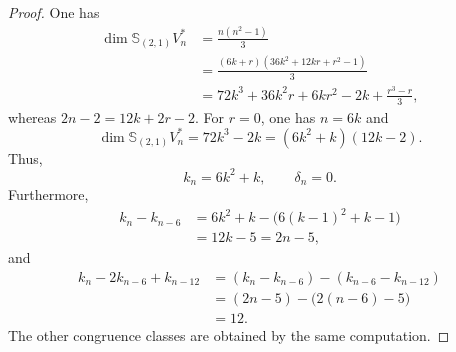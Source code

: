 \documentclass[a4paper,reqno]{amsart}
\theoremstyle{plainnopunct}
\theoremstyle{definitionnopunct}
\renewcommand{\S}{\mathbb{S}}
\begin{document}
\begin{proof}
One has
\[
\begin{aligned}
\dim\S_{(2,1)}V_n^*
&=
\frac{n(n^2-1)}{3}
\\
&=
\frac{
(6k+r)
\left(
36k^2+12kr+r^2-1
\right)
}{3}
\\
&=
72k^3
+
36k^2r
+
6kr^2
-
2k
+
\frac{r^3-r}{3},
\end{aligned}
\]
whereas
$2n-2
=
12k+2r-2$. For $r=0$, one has $n=6k$ and
\[
\dim\S_{(2,1)}V_n^*
=
72k^3-2k
=
(6k^2+k)(12k-2).
\]
Thus,
\[
k_n=6k^2+k,
\qquad
\delta_n=0.
\]
Furthermore,
\[
\begin{aligned}
k_n-k_{n-6}
&=
6k^2+k
-
\bigl(
6(k-1)^2+k-1
\bigr)
\\
&=
12k-5
=
2n-5,
\end{aligned}
\]
and
\[
\begin{aligned}
k_n-2k_{n-6}+k_{n-12}
&=
(k_n-k_{n-6})
-
(k_{n-6}-k_{n-12})
\\
&=
(2n-5)
-
\bigl(
2(n-6)-5
\bigr)
\\
&=
12.
\end{aligned}
\]
The other congruence classes are obtained by the same computation.
\end{proof}
\end{document}
